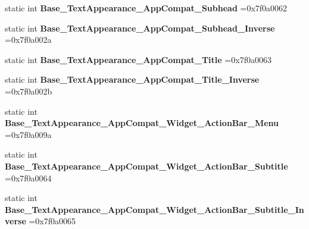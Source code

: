 \begin{DoxyCompactItemize}
\item 
\mbox{\label{classandroid_1_1support_1_1v7_1_1recyclerview_1_1R_1_1style_a5669a7d2d15dc714714f749bc695b95d}} 
static int {\bfseries Base\+\_\+\+Text\+Appearance\+\_\+\+App\+Compat\+\_\+\+Subhead} =0x7f0a0062
\item 
\mbox{\label{classandroid_1_1support_1_1v7_1_1recyclerview_1_1R_1_1style_ade114ec47ae4cf48956244d42d4b60bc}} 
static int {\bfseries Base\+\_\+\+Text\+Appearance\+\_\+\+App\+Compat\+\_\+\+Subhead\+\_\+\+Inverse} =0x7f0a002a
\item 
\mbox{\label{classandroid_1_1support_1_1v7_1_1recyclerview_1_1R_1_1style_a69090dd0fbc89c61aff794ba7323a144}} 
static int {\bfseries Base\+\_\+\+Text\+Appearance\+\_\+\+App\+Compat\+\_\+\+Title} =0x7f0a0063
\item 
\mbox{\label{classandroid_1_1support_1_1v7_1_1recyclerview_1_1R_1_1style_a7dd031ae4e9b02f18e4516eb3f3f869b}} 
static int {\bfseries Base\+\_\+\+Text\+Appearance\+\_\+\+App\+Compat\+\_\+\+Title\+\_\+\+Inverse} =0x7f0a002b
\item 
\mbox{\label{classandroid_1_1support_1_1v7_1_1recyclerview_1_1R_1_1style_af876dfb33d8d373a5a2e6835047bb3ff}} 
static int {\bfseries Base\+\_\+\+Text\+Appearance\+\_\+\+App\+Compat\+\_\+\+Widget\+\_\+\+Action\+Bar\+\_\+\+Menu} =0x7f0a009a
\item 
\mbox{\label{classandroid_1_1support_1_1v7_1_1recyclerview_1_1R_1_1style_af48d076a93f4c1c3f1e0e251b518464a}} 
static int {\bfseries Base\+\_\+\+Text\+Appearance\+\_\+\+App\+Compat\+\_\+\+Widget\+\_\+\+Action\+Bar\+\_\+\+Subtitle} =0x7f0a0064
\item 
\mbox{\label{classandroid_1_1support_1_1v7_1_1recyclerview_1_1R_1_1style_a4ba8ecd85341d9ca93fbf2091fadb17a}} 
static int {\bfseries Base\+\_\+\+Text\+Appearance\+\_\+\+App\+Compat\+\_\+\+Widget\+\_\+\+Action\+Bar\+\_\+\+Subtitle\+\_\+\+Inverse} =0x7f0a0065

\end{DoxyCompactItemize}
